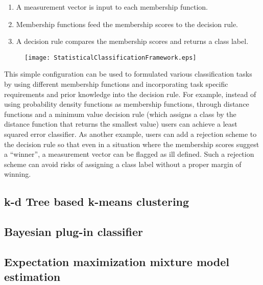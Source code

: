 \begin{enumerate}
\item{A measurement vector is input to each membership function.}
\item{Membership functions feed the membership scores to the
    decision rule.}
\item{A decision rule compares the membership scores and returns a
    class label.}
\end{enumerate}

\begin{figure}
  \centering
  \texttt{[image: StatisticalClassificationFramework.eps]}
  \protect\label{fig:StatisticalClassificationFramework}
\end{figure}

This simple configuration can be used to formulated various
classification tasks by using different membership functions and
incorporating task specific requirements and prior knowledge into
the decision rule. For example, instead of using probability density
functions as membership functions, through distance functions and a
minimum value decision rule (which assigns a class by the distance
function that returns the smallest value) users can achieve a least
squared error classifier. As another example, users can add a
rejection scheme to the decision rule so that even in a situation
where the membership scores suggest a ``winner'', a measurement
vector can be flagged as ill defined. Such a rejection scheme can
avoid risks of assigning a class label without a proper margin of
winning.

\subsection{k-d Tree based k-means clustering}
\label{sec:KdTreeBasedKMeansClustering}



\subsection{Bayesian plug-in classifier}
\label{sec:BayesianPluginClassifier}



\subsection{Expectation maximization mixture model estimation}
\label{sec:ExpectationMaximizationMixtureModelEstimation}





